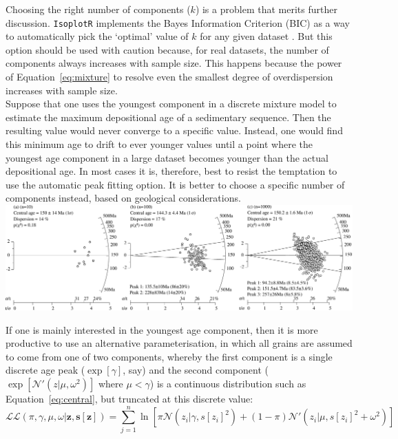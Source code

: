 \begin{refsection}
Choosing the right number of components ($k$) is a problem that merits
further discussion. \texttt{IsoplotR} implements the Bayes Information
Criterion (BIC) as a way to automatically pick the `optimal' value of
$k$ for any given dataset \citep[Section~5.6 of][]{galbraith2005}. But
this option should be used with caution because, for real datasets,
the number of components always increases with sample size. This
happens because the power of Equation~\ref{eq:mixture} to resolve even
the smallest degree of overdispersion increases with sample size.\\

Suppose that one uses the youngest component in a discrete mixture
model to estimate the maximum depositional age of a sedimentary
sequence. Then the resulting value would never converge to a specific
value.  Instead, one would find this minimum age to drift to ever
younger values until a point where the youngest age component in a
large dataset becomes younger than the actual depositional age. In
most cases it is, therefore, best to resist the temptation to use the
automatic peak fitting option. It is better to choose a specific
number of components instead, based on geological considerations.\\

\noindent\includegraphics[width=\textwidth]{../figures/increasingn.pdf}
\begingroup {}
\label{fig:increasingn}
\endgroup

If one is mainly interested in the youngest age component, then it is
more productive to use an alternative parameterisation, in which all
grains are assumed to come from one of two components, whereby the
first component is a single discrete age peak ($\exp[\gamma]$, say)
and the second component ($\exp[\mathcal{N}'(z|\mu,\omega^2)]$ where
$\mu<\gamma$) is a continuous distribution such as
Equation~\ref{eq:central}, but truncated at this discrete value:
\begin{equation}
  \mathcal{LL}(\pi,\gamma,\mu,\omega|\mathbf{z},\mathbf{s[z]}) =
  \sum\limits_{j=1}^{n} \ln\!\left[
    \pi \mathcal{N}(z_i|\gamma,s[z_i]^2) +
    (1-\pi) \mathcal{N}'(z_i|\mu,s[z_i]^2+\omega^2)
    \right]
\label{eq:Lminagemod}
\end{equation}


\end{refsection}
